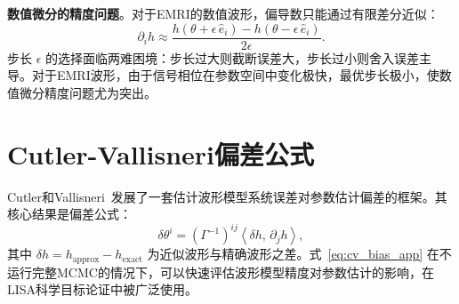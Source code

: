 \textbf{数值微分的精度问题}。对于EMRI的数值波形，偏导数只能通过有限差分近似：
\begin{equation}
  \partial_i h \approx \frac{h(\theta + \epsilon\,\hat{e}_i) - h(\theta - \epsilon\,\hat{e}_i)}{2\epsilon}.
\end{equation}
步长 $\epsilon$ 的选择面临两难困境：步长过大则截断误差大，步长过小则舍入误差主导。对于EMRI波形，由于信号相位在参数空间中变化极快，最优步长极小，使数值微分精度问题尤为突出。

\section{Cutler-Vallisneri偏差公式}

Cutler和Vallisneri~\cite{Cutler2007Vallisneri}发展了一套估计波形模型系统误差对参数估计偏差的框架。其核心结果是偏差公式：
\begin{equation}
  \delta\theta^i = \left(\Gamma^{-1}\right)^{ij} \left\langle \delta h,\, \partial_j h \right\rangle,
  \label{eq:cv_bias_app}
\end{equation}
其中 $\delta h = h_\mathrm{approx} - h_\mathrm{exact}$ 为近似波形与精确波形之差。式~\eqref{eq:cv_bias_app} 在不运行完整MCMC的情况下，可以快速评估波形模型精度对参数估计的影响，在LISA科学目标论证中被广泛使用。

\begingroup
\renewcommand{\bibsection}{\section*{参考文献}}


\endgroup
